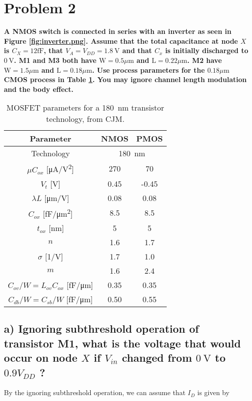 \section{Problem 2}

\textbf{A NMOS switch is connected in series with an inverter as seen in Figure \ref{fig:inverter.png}. Assume that the total capacitance at node $X$ is $C_X=12 \mathrm{fF}$, that $V_A=V_{D D}=1.8 \mathrm{~V}$ and that $C_x$ is initially discharged to $0 \mathrm{~V}$. M1 and M3 both have $\mathrm{W}=0.5 \mu \mathrm{m}$ and $\mathrm{L}=0.22 \mu \mathrm{m}$. M2 have $\mathrm{W}=1.5 \mu \mathrm{m}$ and $\mathrm{L}=0.18 \mu \mathrm{m}$. Use process parameters for the $0.18 \mu \mathrm{m}$ CMOS process in Table \ref{tab:MOSFET_parameters}. You may ignore channel length modulation and the body effect.}

\begin{table}[H]
    \centering
    \caption{MOSFET parameters for a \SI{180}{nm} transistor technology, from CJM.}
    \label{tab:MOSFET_parameters}
    \begin{tabular}{ccc}
    \hline 
    Parameter & NMOS & PMOS \\
    \hline 
    Technology & \multicolumn{2}{c}{\SI{180}{nm}} \\
    \(\mu C_{ox}\) [\si{\micro\ampere/\volt^2}] & 270 & 70 \\
    \(V_t\) [\si{\volt}] & 0.45 & -0.45 \\
    \(\lambda L\) [\si{\micro\meter/\volt}] & 0.08 & 0.08 \\
    \(C_{ox}\) [\si{\femto\farad/\micro\meter^2}] & 8.5 & 8.5 \\
    \(t_{ox}\) [\si{\nano\meter}] & 5 & 5 \\
    \(n\) & 1.6 & 1.7 \\
    \(\sigma\) [\si{1/\volt}] & 1.7 & 1.0 \\
    \(m\) & 1.6 & 2.4 \\
    \(C_{ov}/W=L_{ov} C_{ox}\) [\si{\femto\farad/\micro\meter}] & 0.35 & 0.35 \\
    \(C_{db}/W=C_{sb}/W\) [\si{\femto\farad/\micro\meter}] & 0.50 & 0.55 \\
    \hline
    \end{tabular}
\end{table}

\subsection*{a) Ignoring subthreshold operation of transistor M1, what is the voltage that would occur on node $X$ if $V_{i n}$ changed from $0 \mathrm{~V}$ to $0.9 V_{D D}$ ?}
By the ignoring subthreshold operation, we can assume that $I_D$ is given by

